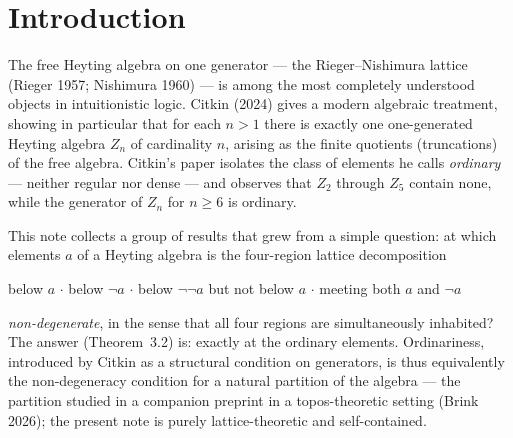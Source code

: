 ﻿\documentclass[11pt]{amsart}
\theoremstyle{plain}
\theoremstyle{definition}
\theoremstyle{remark}
\newcommand{\ZZ}{\mathbb{Z}}
\newcommand{\Znn}[1]{Z_{#1}}
\begin{document}
\begin{abstract}
therefore isomorphic to $\Znn{6}$. For every
$n = p_1^{a_1} \cdots p_k^{a_k}$, the number of ordinary elements of the
subgroup lattice of $\ZZ/n\ZZ$ is exactly
$\prod (a_i + 1) - \prod a_i - 2^k + 1$; consequently an ordinary element
exists iff $n$ has at least two prime divisors and is not squarefree, and is
\emph{unique} iff $n = p^2 q$ --- with no restriction on the number of prime
factors. The least such $n$ is $12$. (6)~\emph{Substitution monoid:}
endomorphisms of a one-generated Heyting algebra are determined by their value
at the generator, and the identity of the endomorphism monoid is the unique
endomorphism fixing the unique ordinary element;
$\mathrm{End}(\Znn{6}) \cong \Znn{6}$ with exactly six endomorphisms, each
satisfying $f^3 = f$ (a machine-checked instance of Ruitenburg's
periodicity). In the pitch-class reading of $\ZZ/12\ZZ$, the unique
ordinary element is the tritone, and the four regions of (1) are inhabited by
the tritone, the augmented triad, the diminished seventh chord, and the
whole-tone scale. All principal results are kernel-checked in Lean~4 against
Mathlib4 with standard axioms only and no .
\end{abstract}

\maketitle

\section{Introduction}

The free Heyting algebra on one generator --- the Rieger--Nishimura lattice
(Rieger 1957; Nishimura 1960) --- is among the most completely understood
objects in intuitionistic logic. Citkin (2024) gives a modern algebraic
treatment, showing in particular that for each $n > 1$ there is exactly one
one-generated Heyting algebra $\Znn{n}$ of cardinality $n$, arising as the
finite quotients (truncations) of the free algebra. Citkin's paper isolates
the class of elements he calls \emph{ordinary} --- neither regular nor dense
--- and observes that $\Znn{2}$ through $\Znn{5}$ contain none, while the
generator of $\Znn{n}$ for $n \ge 6$ is ordinary.

This note collects a group of results that grew from a simple question: at
which elements $a$ of a Heyting algebra is the four-region lattice
decomposition
\begin{center}
below $a$ \;$\cdot$\; below $\neg a$ \;$\cdot$\; below $\neg\neg a$ but not
below $a$ \;$\cdot$\; meeting both $a$ and $\neg a$
\end{center}
\emph{non-degenerate}, in the sense that all four regions are simultaneously
inhabited? The answer (Theorem~3.2) is: exactly at the ordinary elements.
Ordinariness, introduced by Citkin as a structural condition on generators, is
thus equivalently the non-degeneracy condition for a natural partition of the
algebra --- the partition studied in a companion preprint in a topos-theoretic
setting (Brink 2026); the present note is purely lattice-theoretic and
self-contained.
\end{document}
